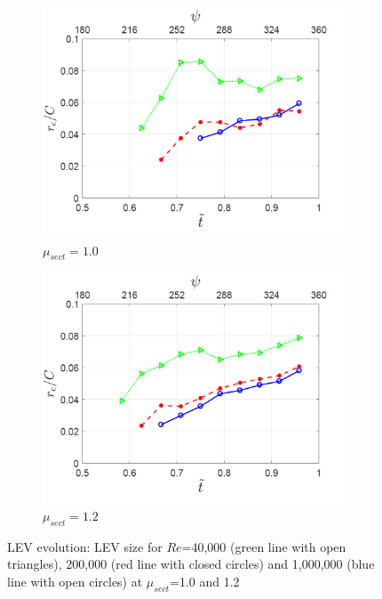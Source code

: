 \begin{figure}[H]
	\begin{subfigure}{0.5\textwidth}
		\includegraphics[width=1\textwidth]{figures/LEV_size_lambda_1pt0.png}
		\caption{$\mu_{sect} = 1.0$}
		\label{fig:LEV_size_lambda_1p0}
	\end{subfigure}
 	\begin{subfigure}{0.5\textwidth}
	\includegraphics[width=1\textwidth]{figures/LEV_size_lambda_1pt2.png}
	\caption{$\mu_{sect} = 1.2$}
	\label{fig:LEV_size_lambda_1p2}
	\end{subfigure}
 	\caption{LEV evolution: LEV size for $Re$=40,000 (green line with open triangles), 200,000 (red line with closed circles) and 1,000,000 (blue line with open circles) at $\mu_{sect}$=1.0 and 1.2}
 	\label{fig:LEV_size}
\end{figure}





